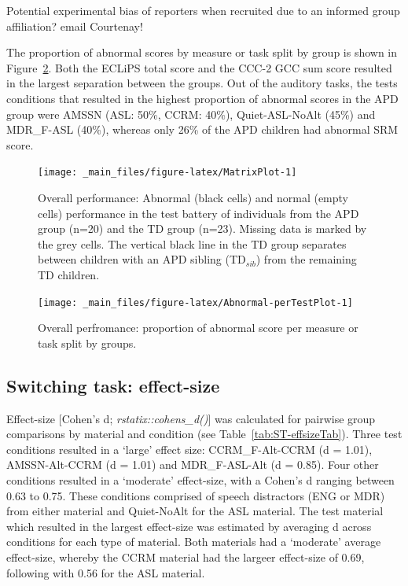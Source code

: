 \documentclass[a4paper, twoside]{templates/ociamthesis}
\begin{document}
\begin{correction}
{Potential experimental bias of reporters when recruited due to an
informed group affiliation? email Courtenay!}
\end{correction}

\hfill\break
The proportion of abnormal scores by measure or task split by group is shown in Figure~\ref{fig:Abnormal-perTestPlot}. Both the ECLiPS total score and the CCC-2 GCC sum score resulted in the largest separation between the groups. Out of the auditory tasks, the tests conditions that resulted in the highest proportion of abnormal scores in the APD group were AMSSN (ASL: 50\%, CCRM: 40\%), Quiet-ASL-NoAlt (45\%) and MDR\_F-ASL (40\%), whereas only 26\% of the APD children had abnormal SRM score.\\

\begin{figure}

{\centering \texttt{[image: \_main\_files/figure-latex/MatrixPlot-1]} 

}

\caption{Overall performance: Abnormal (black cells) and normal (empty cells) performance in the test battery of individuals from the APD group (n=20) and the TD group (n=23). Missing data is marked by the grey cells. The vertical black line in the TD group separates between children with an APD sibling (TD$_{sib}$) from the remaining TD children.}\label{fig:MatrixPlot}
\end{figure}

\begin{figure}

{\centering \texttt{[image: \_main\_files/figure-latex/Abnormal-perTestPlot-1]} 

}

\caption{Overall perfromance: proportion of abnormal score per measure or task split by groups.}\label{fig:Abnormal-perTestPlot}
\end{figure}

\hypertarget{switching-task-effect-size}{%
\subsection{Switching task: effect-size}\label{switching-task-effect-size}}

\hfill\break
Effect-size {[}Cohen's d; \emph{rstatix::cohens\_d()}{]} was calculated for pairwise group comparisons by material and condition (see Table~\ref{tab:ST-effsizeTab}). Three test conditions resulted in a `large' effect size: CCRM\_F-Alt-CCRM (d = 1.01), AMSSN-Alt-CCRM (d = 1.01) and MDR\_F-ASL-Alt (d = 0.85). Four other conditions resulted in a `moderate' effect-size, with a Cohen's d ranging between 0.63 to 0.75. These conditions comprised of speech distractors (ENG or MDR) from either material and Quiet-NoAlt for the ASL material. The test material which resulted in the largest effect-size was estimated by averaging d across conditions for each type of material. Both materials had a `moderate' average effect-size, whereby the CCRM material had the largeer effect-size of 0.69, following with 0.56 for the ASL material.\\
\end{document}
